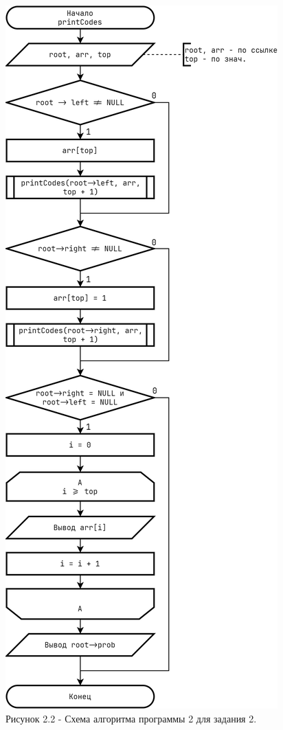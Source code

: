 \documentclass[oneside,a4paper,14pt]{extarticle}
\begin{document}
\begin{figure}[h!]
	\centering
	\includegraphics[height=0.7\textheight]{pics/flowchart_2_p2.png}
	\caption*{Рисунок 2.2 - Схема алгоритма программы 2 для задания 2.}
\end{figure}
\end{document}

